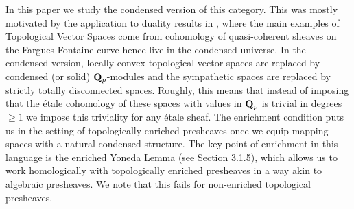 \documentclass[10pt]{amsart}
\theoremstyle{definition}
\theoremstyle{remark}
\numberwithin{equation}{section}
\def\Q{{\bf Q}} \def\Z{{\bf Z}}
\numberwithin{equation}{section}
\begin{document}
    In this paper we study the condensed version of this category.
 This was mostly motivated  by the application to duality results in \cite{CGN2}, where the main examples of Topological Vector Spaces come from cohomology of  quasi-coherent sheaves on the Fargues-Fontaine curve hence live in the condensed universe.
 In the condensed version, locally convex topological vector spaces are replaced by condensed  (or solid) ${\Q}_p$-modules and the sympathetic spaces are replaced by strictly totally disconnected spaces.
 Roughly, this means that instead of  imposing that the \'etale cohomology of these spaces with values in  $\Q_p$   is trivial in degrees~$\geq 1$  we impose this triviality 
 for  any  \'etale sheaf.
  The enrichment condition puts us in the setting of  topologically enriched presheaves once we equip mapping spaces with a natural condensed structure.
 The key point of enrichment in this language is the enriched Yoneda Lemma (see Section 3.1.5), which allows us to work homologically with topologically enriched  presheaves in a way akin to algebraic presheaves.
 We note that this  fails for  non-enriched  topological presheaves. 
   
\end{document}
